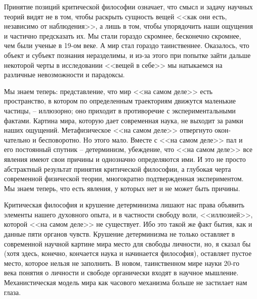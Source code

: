 \documentclass{book}
\begin{document}
Принятие позиций критической философии означает, что смысл и задачу научных теорий видят не в том, чтобы раскрыть сущность вещей <<как они есть, независимо от наблюдения>>, а лишь в том, чтобы упорядочить наши ощущения и частично предсказать их. Мы стали гораздо скромнее, бесконечно скром­нее, чем были ученые в 19-ом веке. А мир стал гораздо таинст­веннее. Оказалось, что объект и субъект познания неразделимы, и из-за этого при попытке зайти дальше некоторой черты в ис­следовании <<вещей в себе>> мы натыкаемся на различные невоз­можности и парадоксы.

Мы знаем теперь: представление, что мир <<на самом деле>> есть пространство, в котором по определенным траекториям движутся маленькие частицы, -- иллюзорно; оно приходит в противоречие с экспериментальными фактами. Картина мира, которую дает современная наука, не выходит за рамки наших ощущений. Метафизическое <<на самом деле>> отвергнуто окон­чательно и бесповоротно. Но этого мало. Вместе с <<на самом деле>> пал и его постоянный спутник -- детерминизм, убежде­ние, что <<на самом деле>> все явления имеют свои причины и однозначно определяются ими. И это не просто абстрактный результат принятия критической философии, а глубокая черта современной физической теории, многократно подтвержденная экспериментом. Мы знаем теперь, что есть явления, у которых нет и не может быть причины.

Критическая философия и крушение детерминизма лишают нас права объявить элементы нашего духовного опыта, и в частности свободу воли, <<иллюзией>>, которой <<на самом деле>> не существует. Ибо это такой же факт бытия, как и данные пяти органов чувств. Крушение детерминизма не только оставляет в современной научной картине мира место для свободы личности, но, я сказал бы (хотя здесь, конечно, кончается наука и начинается философия), оставляет пустое  место, которое нельзя не заполнить.  В новом, таинственном мире науки 20-го века понятия о личности и свободе органически входят в науч­ное мышление. Механистическая модель мира как часового механизма больше не застилает нам глаза.
\end{document}
